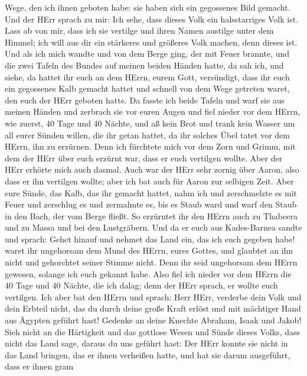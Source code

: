 Wege, den ich ihnen geboten habe: sie haben sich ein gegossenes Bild
gemacht.  Und der HErr sprach zu mir: Ich sehe, dass dieses
Volk ein halsstarriges Volk ist.  Lass ab von mir, dass ich
sie vertilge und ihren Namen austilge unter dem Himmel; ich will aus dir
ein stärkeres und größeres Volk machen, denn dieses ist. 
Und als ich mich wandte und von dem Berge ging, der mit Feuer brannte,
und die zwei Tafeln des Bundes auf meinen beiden Händen hatte,
 da sah ich, und siehe, da hattet ihr euch an dem HErrn,
eurem Gott, versündigt, dass ihr euch ein gegossenes Kalb gemacht hattet
und schnell von dem Wege getreten waret, den euch der HErr geboten
hatte.  Da fasste ich beide Tafeln und warf sie aus meinen
Händen und zerbrach sie vor euren Augen  und fiel nieder
vor dem HErrn, wie zuerst, 40 Tage und 40 Nächte, und aß kein Brot und
trank kein Wasser um all eurer Sünden willen, die ihr getan hattet, da
ihr solches Übel tatet vor dem HErrn, ihn zu erzürnen. 
Denn ich fürchtete mich vor dem Zorn und Grimm, mit dem der HErr über
euch erzürnt war, dass er euch vertilgen wollte. Aber der HErr erhörte
mich auch dasmal.  Auch war der HErr sehr zornig über
Aaron, also dass er ihn vertilgen wollte; aber ich bat auch für Aaron
zur selbigen Zeit.  Aber eure Sünde, das Kalb, das ihr
gemacht hattet, nahm ich und zerschmelzte es mit Feuer und zerschlug es
und zermalmte es, bis es Staub ward und warf den Staub in den Bach, der
vom Berge fließt.  So erzürntet ihr den HErrn auch zu
Thabeera und zu Massa und bei den Lustgräbern.  Und da er
euch aus Kades-Barnea sandte und sprach: Gehet hinauf und nehmet das
Land ein, das ich euch gegeben habe! waret ihr ungehorsam dem Mund des
HErrn, eures Gottes, und glaubtet an ihn nicht und gehorchtet seiner
Stimme nicht.  Denn ihr seid ungehorsam dem HErrn gewesen,
solange ich euch gekannt habe.  Also fiel ich nieder vor
dem HErrn die 40 Tage und 40 Nächte, die ich dalag; denn der HErr
sprach, er wollte euch vertilgen.  Ich aber bat den HErrn
und sprach: Herr HErr, verderbe dein Volk und dein Erbteil nicht, das du
durch deine große Kraft erlöst und mit mächtiger Hand aus Ägypten
geführt hast!  Gedenke an deine Knechte Abraham, Isaak und
Jakob! Sieh nicht an die Härtigkeit und das gottlose Wesen und Sünde
dieses Volks,  dass nicht das Land sage, daraus du uns
geführt hast: Der HErr konnte sie nicht in das Land bringen, das er
ihnen verheißen hatte, und hat sie darum ausgeführt, dass er ihnen gram

